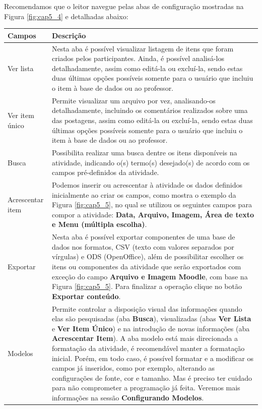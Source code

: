 Recomendamos que o leitor navegue pelas abas de configuração mostradas na Figura \ref{fig:cap5_4} e detalhadas abaixo:
\begin{longtable}{p{4.5cm}|p{10.5cm}}
   \hline
 \rowcolor[rgb]{0.8,0.8,0.8} \textbf{Campos} &  \textbf{Descrição}\\\hline
  {Ver lista} &  Nesta aba é possível visualizar listagem de itens que foram criados pelos participantes. Ainda, é possível analisá-los detalhadamente, assim como editá-la ou excluí-la, sendo estas duas últimas opções possíveis somente para o usuário que incluiu o item à base de dados ou ao professor.\\\hline
 {Ver item único} & Permite visualizar um arquivo por vez, analisando-os detalhadamente, incluindo os comentários realizados sobre uma das postagens, assim como editá-la ou excluí-la, sendo estas duas últimas opções possíveis somente para o usuário que incluiu o item à base de dados ou ao professor.\\\hline
 {Busca} &  Possibilita realizar uma busca dentre os itens disponíveis na atividade, indicando o(s) termo(s) desejado(s) de acordo com os campos pré-definidos da atividade.\\\hline
 {Acrescentar item} &  Podemos inserir ou acrescentar à atividade os dados definidos inicialmente ao criar os campos, como mostra o exemplo da Figura \ref{fig:cap5_5}, no qual se utilizou os seguintes campos para compor a atividade: \textbf{Data, Arquivo, Imagem, Área de texto e Menu (múltipla escolha)}.\\\hline
 {Exportar} &  Nesta aba é possível exportar componentes de uma base de dados nos formatos, CSV (texto com valores separados por vírgulas) e ODS (OpenOffice), além de possibilitar escolher os itens ou componentes da atividade que serão exportados com exceção do campo \textbf{Arquivo e Imagem Moodle}, com base na Figura \ref{fig:cap5_5}. Para finalizar a operação clique no botão \textbf{Exportar conteúdo}.\\\hline
 
 {Modelos} & Permite controlar a disposição visual das informações quando elas são pesquisadas (aba \textbf{Busca}), visualizadas (abas \textbf{Ver Lista} e \textbf{Ver Item Único}) e na introdução de novas informações (aba \textbf{Acrescentar Item}). A aba modelo está mais direcionada a formatação da atividade, é recomendável manter a formatação inicial. Porém, em todo caso, é possível formatar e a modificar os campos já inseridos, como por exemplo, alterando as configurações de fonte, cor e tamanho. Mas é preciso ter cuidado para não comprometer a programação já feita. Veremos mais informações na sessão \textbf{Configurando Modelos}.\\\hline
 

\end{longtable}
